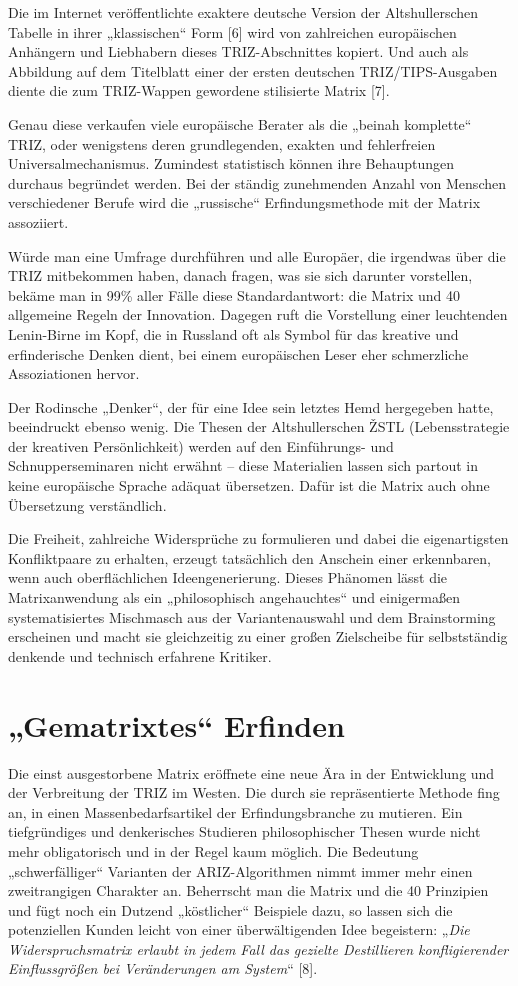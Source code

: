 \documentclass[11pt,a4paper]{article}
\begin{document}
Die im Internet veröffentlichte exaktere deutsche Version der Altshullerschen
Tabelle in ihrer „klassischen“ Form [6] wird von zahlreichen europäischen
Anhängern und Liebhabern dieses TRIZ-Abschnittes kopiert. Und auch als
Abbildung auf dem Titelblatt einer der ersten deutschen TRIZ/TIPS-Ausgaben
diente die zum TRIZ-Wappen gewordene stilisierte Matrix [7].

Genau diese verkaufen viele europäische Berater als die „beinah komplette“
TRIZ, oder wenigstens deren grundlegenden, exakten und fehlerfreien
Universalmechanismus.  Zumindest statistisch können ihre Behauptungen durchaus
begründet werden. Bei der ständig zunehmenden Anzahl von Menschen
verschiedener Berufe wird die „russische“ Erfindungsmethode mit der Matrix
assoziiert.

Würde man eine Umfrage durchführen und alle Europäer, die irgendwas über die
TRIZ mitbekommen haben, danach fragen, was sie sich darunter vorstellen,
bekäme man in 99\% aller Fälle diese Standardantwort: die Matrix und 40
allgemeine Regeln der Innovation.  Dagegen ruft die Vorstellung einer
leuchtenden Lenin-Birne im Kopf, die in Russland oft als Symbol für das
kreative und erfinderische Denken dient, bei einem europäischen Leser eher
schmerzliche Assoziationen hervor.

Der Rodinsche „Denker“, der für eine Idee sein letztes Hemd hergegeben hatte,
beeindruckt ebenso wenig. Die Thesen der Altshullerschen ŽSTL (Lebensstrategie
der kreativen Persön\-lich\-keit) werden auf den Einführungs- und
Schnupperseminaren nicht erwähnt – diese Materialien lassen sich partout in
keine europäische Sprache adäquat übersetzen. Dafür ist die Matrix auch ohne
Übersetzung verständlich.

Die Freiheit, zahlreiche Widersprüche zu formulieren und dabei die
eigenartigsten Konfliktpaare zu erhalten, erzeugt tatsächlich den Anschein
einer erkennbaren, wenn auch oberflächlichen Ideengenerierung. Dieses Phänomen
lässt die Matrixanwendung als ein „philosophisch angehauchtes“ und
einigermaßen systematisiertes Mischmasch aus der Variantenauswahl und dem
Brainstorming erscheinen und macht sie gleichzeitig zu einer großen
Zielscheibe für selbstständig denkende und technisch erfahrene Kritiker.

\section*{„Gematrixtes“ Erfinden}
Die einst ausgestorbene Matrix eröffnete eine neue Ära in der Entwicklung und
der Verbreitung der TRIZ im Westen. Die durch sie repräsentierte Methode fing
an, in einen Massenbedarfsartikel der Erfindungsbranche zu mutieren. Ein
tiefgründiges und denkerisches Studieren philosophischer Thesen wurde nicht
mehr obligatorisch und in der Regel kaum möglich. Die Bedeutung
„schwerfälliger“ Varianten der ARIZ-Algorithmen nimmt immer mehr einen
zweitrangigen Charakter an. Beherrscht man die Matrix und die 40 Prinzipien
und fügt noch ein Dutzend „köstlicher“ Beispiele dazu, so lassen sich die
potenziellen Kunden leicht von einer überwältigenden Idee begeistern:
„\emph{Die Widerspruchsmatrix erlaubt in jedem Fall das gezielte Destillieren
  konfligierender Einflussgrößen bei Veränderungen am System}“ [8].
\end{document}
